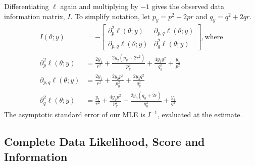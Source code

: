\documentclass[11pt, oneside]{article}   	%
\begin{document}
\begin{appendices}
    Differentiating $\ell$ again and multiplying by $-1$ gives the observed data information matrix, $I$. To simplify notation, let $p_y = p^2 + 2pr$ and $q_y = q^2 + 2qr$.
    \begin{align}
        I(\theta;y) &= - \begin{bmatrix}
            \partial^2_p \ell(\theta; y) & \partial_{p,q} \ell(\theta; y)\\
            \partial_{p,q} \ell(\theta; y) & \partial^2_q \ell(\theta; y)
        \end{bmatrix} \mathrm{, where}\\
        \partial^2_p \ell(\theta; y) &=  \frac{2y_1}{r^2} + \frac{2 y_2 (p_y + 2r^2)}{p_y^2} + \frac{4 y_3 q^2}{q_y^2} + \frac{y_4}{p^2}\\
        \partial_{p,q} \ell(\theta; y) &=  \frac{2y_1}{r^2} + \frac{2 y_2 p^2}{p_y^2} + \frac{2 y_3 q^2}{q_y^2}\\
        \partial^2_q \ell(\theta; y) &=  \frac{y_1}{r^2} + \frac{4 y_2 p^2}{p_y^2} + \frac{2 y_3 (q_y + 2r)}{q_y^2} + \frac{y_4}{q^2}
    \end{align}
    The asymptotic standard error of our MLE is $I^{-1}$, evaluated at the estimate.

    \subsection{Complete Data Likelihood, Score and Information}
    \label{app:blood_complete}


\end{appendices}
\end{document}
